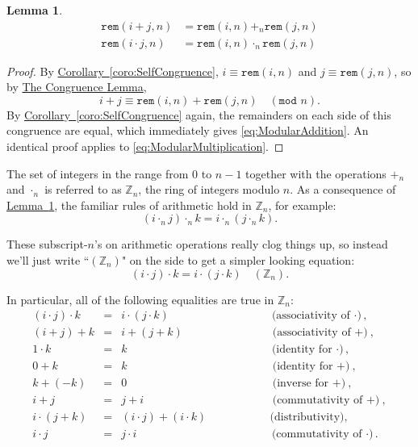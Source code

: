 \documentclass[11pt,oneside]{book}
\newtheorem{lem}[thm]{Lemma}
\theoremstyle{definition}
\begin{document}
\begin{lem} \label{lem:ModularOperations}
    \begin{align}
        \texttt{rem}(i + j, n) &= \texttt{rem}(i, n) +_{n} \texttt{rem}(j, n) \label{eq:ModularAddition} \\
        \texttt{rem}(i \cdot j, n) &= \texttt{rem}(i, n) \cdot_{n} \texttt{rem}(j, n) \label{eq:ModularMultiplication}
    \end{align}
\end{lem}
\begin{proof}
    By \hyperref[coro:SelfCongruence]{Corollary~\ref*{coro:SelfCongruence}}, $i \equiv \texttt{rem}(i, n)$ and $j \equiv \texttt{rem}(j, n)$, so by \hyperref[lem:Congruence]{The Congruence Lemma},
    \[ i + j \equiv \texttt{rem}(i, n) + \texttt{rem}(j, n)\quad (\texttt{mod } n). \]
    By \hyperref[coro:SelfCongruence]{Corollary~\ref*{coro:SelfCongruence}} again, the remainders on each side of this congruence are equal, which immediately gives \eqref{eq:ModularAddition}.
    An identical proof applies to \eqref{eq:ModularMultiplication}.
\end{proof}

The set of integers in the range from 0 to $n - 1$ together with the operations $+_{n}$ and $\cdot_{n}$ is referred to as $\mathbb{Z}_{n}$, the ring of integers modulo $n$.
As a consequence of \hyperref[lem:ModularOperations]{Lemma~\ref*{lem:ModularOperations}}, the familiar rules of arithmetic hold in $\mathbb{Z}_{n}$, for example:
\[ (i \cdot_{n} j) \cdot_{n} k = i \cdot_{n} (j \cdot_{n} k). \]

These subscript-$n$'s on arithmetic operations really clog things up, so instead we'll just write ``$(\mathbb{Z}_{n})$" on the side to get a simpler looking equation:
\[ (i \cdot j) \cdot k = i \cdot (j \cdot k)\quad (\mathbb{Z}_{n}). \]

In particular, all of the following equalities are true in $\mathbb{Z}_{n}$:
\[\begin{array}{rclcr}
    (i \cdot j) \cdot k &=& i \cdot (j \cdot k) &\qquad\qquad& \text{(associativity of $\cdot$)}, \\
    (i + j) + k &=& i + (j + k) && \text{(associativity of $+$)}, \\
    1 \cdot k &=& k && \text{(identity for $\cdot$)}, \\
    0 + k &=& k && \text{(identity for $+$)}, \\
    k + (-k) &=& 0 && \text{(inverse for $+$)}, \\
    i + j &=& j + i && \text{(commutativity of $+$)}, \\
    i \cdot (j + k) &=& (i \cdot j) + (i \cdot k) && \text{(distributivity)}, \\
    i \cdot j &=& j \cdot i && \text{(commutativity of $\cdot$)}.
\end{array}\]
\end{document}
